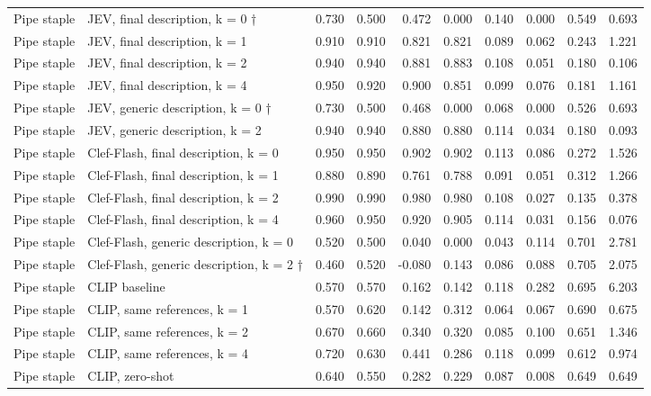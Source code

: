 \begin{table}
\begin{tabular}[t]{llrrrrrrrr}
Pipe staple & JEV, final description, k = 0 † & 0.730 & 0.500 & 0.472 & 0.000 & 0.140 & 0.000 & 0.549 & 0.693\\
\addlinespace
Pipe staple & JEV, final description, k = 1 & 0.910 & 0.910 & 0.821 & 0.821 & 0.089 & 0.062 & 0.243 & 1.221\\
Pipe staple & JEV, final description, k = 2 & 0.940 & 0.940 & 0.881 & 0.883 & 0.108 & 0.051 & 0.180 & 0.106\\
Pipe staple & JEV, final description, k = 4 & 0.950 & 0.920 & 0.900 & 0.851 & 0.099 & 0.076 & 0.181 & 1.161\\
Pipe staple & JEV, generic description, k = 0 † & 0.730 & 0.500 & 0.468 & 0.000 & 0.068 & 0.000 & 0.526 & 0.693\\
Pipe staple & JEV, generic description, k = 2 & 0.940 & 0.940 & 0.880 & 0.880 & 0.114 & 0.034 & 0.180 & 0.093\\
\addlinespace
Pipe staple & Clef-Flash, final description, k = 0 & 0.950 & 0.950 & 0.902 & 0.902 & 0.113 & 0.086 & 0.272 & 1.526\\
Pipe staple & Clef-Flash, final description, k = 1 & 0.880 & 0.890 & 0.761 & 0.788 & 0.091 & 0.051 & 0.312 & 1.266\\
Pipe staple & Clef-Flash, final description, k = 2 & 0.990 & 0.990 & 0.980 & 0.980 & 0.108 & 0.027 & 0.135 & 0.378\\
Pipe staple & Clef-Flash, final description, k = 4 & 0.960 & 0.950 & 0.920 & 0.905 & 0.114 & 0.031 & 0.156 & 0.076\\
Pipe staple & Clef-Flash, generic description, k = 0 & 0.520 & 0.500 & 0.040 & 0.000 & 0.043 & 0.114 & 0.701 & 2.781\\
\addlinespace
Pipe staple & Clef-Flash, generic description, k = 2 † & 0.460 & 0.520 & -0.080 & 0.143 & 0.086 & 0.088 & 0.705 & 2.075\\
Pipe staple & CLIP baseline & 0.570 & 0.570 & 0.162 & 0.142 & 0.118 & 0.282 & 0.695 & 6.203\\
Pipe staple & CLIP, same references, k = 1 & 0.570 & 0.620 & 0.142 & 0.312 & 0.064 & 0.067 & 0.690 & 0.675\\
Pipe staple & CLIP, same references, k = 2 & 0.670 & 0.660 & 0.340 & 0.320 & 0.085 & 0.100 & 0.651 & 1.346\\
Pipe staple & CLIP, same references, k = 4 & 0.720 & 0.630 & 0.441 & 0.286 & 0.118 & 0.099 & 0.612 & 0.974\\
\addlinespace
Pipe staple & CLIP, zero-shot & 0.640 & 0.550 & 0.282 & 0.229 & 0.087 & 0.008 & 0.649 & 0.649\\

\end{tabular}
\end{table}
